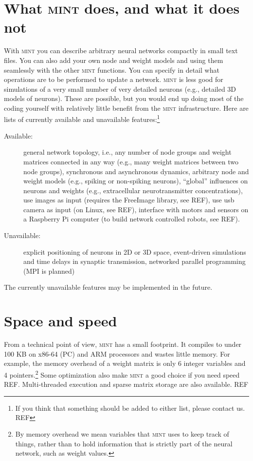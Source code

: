 \documentclass[12pt,letterpaper]{memoir}
\newcommand{\mint}{{\scshape\sffamily mint}\xspace}
\begin{document}
\section{What \mint does, and what it does not}
\label{sec:what-mint-does}

With \mint you can describe arbitrary neural networks compactly in
small text files. You can also add your own node and weight models and
using them seamlessly with the other \mint functions. You can specify
in detail what operations are to be performed to update a network.
\mint is less good for simulations of a very small number of very
detailed neurons (e.g., detailed 3D models of neurons). These are
possible, but you would end up doing most of the coding yourself with
relatively little benefit from the \mint infrastructure.  Here are
lists of currently available and unavailable features:\footnote{If you
  think that something should be added to either list, please contact
  us. REF}
\begin{description}
\item[Available:] general network topology, i.e., any number of node
  groups and weight matrices connected in any way (e.g., many weight
  matrices between two node groups), synchronous and asynchronous
  dynamics, arbitrary node and weight models (e.g., spiking or
  non-spiking neurons), ``global'' influences on neurons and weights
  (e.g., extracellular neurotransmitter concentrations), use images as
  input (requires the FreeImage library, see REF), use usb camera as
  input (on Linux, see REF), interface with motors and sensors on a
  Raspberry Pi computer (to build network controlled robots, see REF).
\item[Unavailable:] explicit positioning of neurons in 2D or 3D space,
  event-driven simulations and time delays in synaptic transmission,
  networked parallel programming (MPI is planned)
\end{description}
The currently unavailable features may be implemented in the future.

\section{Space and speed}

From a technical point of view, \mint has a small footprint. It
compiles to under 100 KB on x86-64 (PC) and ARM processors and wastes
little memory. For example, the memory overhead of a weight matrix is
only 6 integer variables and 4 pointers.\footnote{By memory overhead
  we mean variables that \mint uses to keep track of things, rather
  than to hold information that is strictly part of the neural
  network, such as weight values.}  Some optimization also make \mint
a good choice if you need speed REF. Multi-threaded execution and
sparse matrix storage are also available. REF
\end{document}
